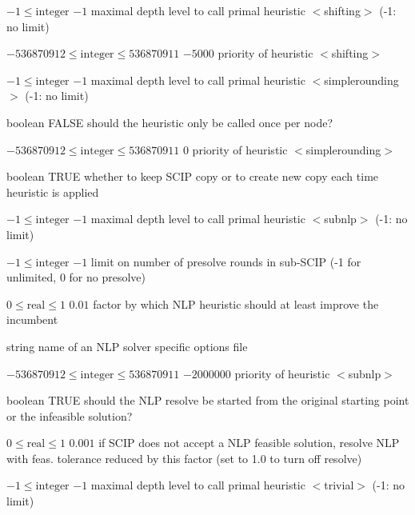 %
{$-1\leq\textrm{integer}$}%
{$-1$}%
{maximal depth level to call primal heuristic $<$shifting$>$ (-1: no limit)}%
{}

%
{$-536870912\leq\textrm{integer}\leq536870911$}%
{$-5000$}%
{priority of heuristic $<$shifting$>$}%
{}

%
{$-1\leq\textrm{integer}$}%
{$-1$}%
{maximal depth level to call primal heuristic $<$simplerounding$>$ (-1: no limit)}%
{}

%
{boolean}%
{FALSE}%
{should the heuristic only be called once per node?}%
{}

%
{$-536870912\leq\textrm{integer}\leq536870911$}%
{$0$}%
{priority of heuristic $<$simplerounding$>$}%
{}

%
{boolean}%
{TRUE}%
{whether to keep SCIP copy or to create new copy each time heuristic is applied}%
{}

%
{$-1\leq\textrm{integer}$}%
{$-1$}%
{maximal depth level to call primal heuristic $<$subnlp$>$ (-1: no limit)}%
{}

%
{$-1\leq\textrm{integer}$}%
{$-1$}%
{limit on number of presolve rounds in sub-SCIP (-1 for unlimited, 0 for no presolve)}%
{}

%
{$0\leq\textrm{real}\leq1$}%
{$0.01$}%
{factor by which NLP heuristic should at least improve the incumbent}%
{}

%
{string}%
{}%
{name of an NLP solver specific options file}%
{}

%
{$-536870912\leq\textrm{integer}\leq536870911$}%
{$-2000000$}%
{priority of heuristic $<$subnlp$>$}%
{}

%
{boolean}%
{TRUE}%
{should the NLP resolve be started from the original starting point or the infeasible solution?}%
{}

%
{$0\leq\textrm{real}\leq1$}%
{$0.001$}%
{if SCIP does not accept a NLP feasible solution, resolve NLP with feas. tolerance reduced by this factor (set to 1.0 to turn off resolve)}%
{}

%
{$-1\leq\textrm{integer}$}%
{$-1$}%
{maximal depth level to call primal heuristic $<$trivial$>$ (-1: no limit)}%
{}

